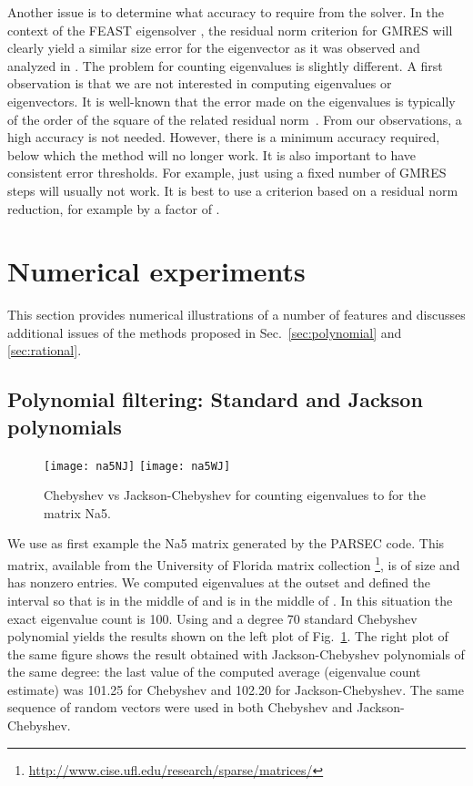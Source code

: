 \documentclass[12pt]{article}		\usepackage{tabls,multirow}
\begin{document}
Another issue is to determine what accuracy to require from the
solver. In the context of the FEAST eigensolver  \cite{FEASTsolver}, 
the residual norm
criterion for GMRES will clearly yield a similar size error for the
eigenvector as it was observed and analyzed in \cite{Kramer-al-FEAST-2013,Tang13}. The
problem for counting eigenvalues is slightly different. A first
observation is that we are not interested in computing eigenvalues or
eigenvectors.  It is well-known that the error made on the eigenvalues is
typically of the order of the square of the related residual
norm~\cite{Saad-book3}. From our observations, a high accuracy is not
needed. However, there is a minimum accuracy required, below which the
method will no longer work. It is also important to have consistent
error thresholds. For example, just using a fixed number of GMRES
steps will usually not work. It is best to use a criterion based on a
residual norm reduction, for example by a factor of .



\section{Numerical experiments}
\label{sec:numtests}
This section provides numerical illustrations of a 
number of features and discusses additional issues of the
methods proposed in Sec.~\ref{sec:polynomial} and
\ref{sec:rational}.

\subsection{Polynomial filtering: Standard and Jackson polynomials}
\label{sec:jackpoly}

\begin{figure}[hbt]
\begin{center} 
\texttt{[image: na5NJ]} 
\texttt{[image: na5WJ]} 
\end{center}
\caption{Chebyshev vs Jackson-Chebyshev for counting eigenvalues
 to   for the matrix Na5.
\label{fig:chebNa5}}
\end{figure}

We use as first example the Na5 matrix generated by the PARSEC
code. This matrix, available from the University of Florida matrix
collection
\footnote{\url{http://www.cise.ufl.edu/research/sparse/matrices/}}, is
of size  and has  nonzero entries.  We
computed eigenvalues at the outset and defined the interval  so
that  is in the middle of  and 
is in the middle of . In this situation
the exact eigenvalue count is 100. Using  and a degree 70
standard Chebyshev polynomial yields the results shown on the left
plot of Fig.~\ref{fig:chebNa5}. The right plot of the same figure
shows the result obtained with Jackson-Chebyshev polynomials of the
same degree: the last value of the computed average (eigenvalue count
estimate) was 101.25 for Chebyshev and 102.20 for
Jackson-Chebyshev. The same sequence of random vectors were used in
both Chebyshev and Jackson-Chebyshev.
\end{document}
